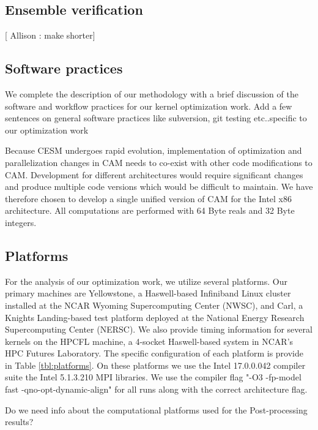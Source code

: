 \subsection{Ensemble verification}

[ {\color{red} Allison :} make shorter]




\subsection{Software practices}

We complete the description of our methodology with a brief discussion of the software and workflow practices for our kernel optimization work.
{\color{red} Add a few sentences on general software practices like subversion, git testing etc..specific to our optimization work}
 

Because CESM undergoes rapid evolution, implementation of optimization and parallelization changes in CAM needs to co-exist with other code modifications to CAM. Development for different architectures would require significant changes and produce multiple code versions which would be difficult to maintain. We have therefore chosen to develop a single unified version of CAM for the Intel x86 architecture.  All computations are performed with 64 Byte reals and 32 Byte integers.

\subsection{Platforms}

For the analysis of our optimization work,  we utilize several platforms.  Our primary machines are Yellowstone, a Haswell-based Infiniband Linux cluster installed at the NCAR Wyoming Supercomputing Center (NWSC), and Carl,  a Knights Landing-based test platform deployed at the National Energy Research Supercomputing Center (NERSC).  
We also provide timing information for several kernels on the HPCFL machine, a 4-socket Haswell-based system in NCAR's HPC Futures Laboratory.  The specific configuration of each platform is provide in Table \ref{tbl:platforms}.  On these platforms we use the Intel 17.0.0.042 compiler suite the Intel 5.1.3.210 MPI libraries.  We use the compiler flag "-O3 -fp-model fast -qno-opt-dynamic-align" for all runs along with the correct architecture flag.  

{\color{red} Do we need info about the computational platforms used for the Post-processing results?}  


